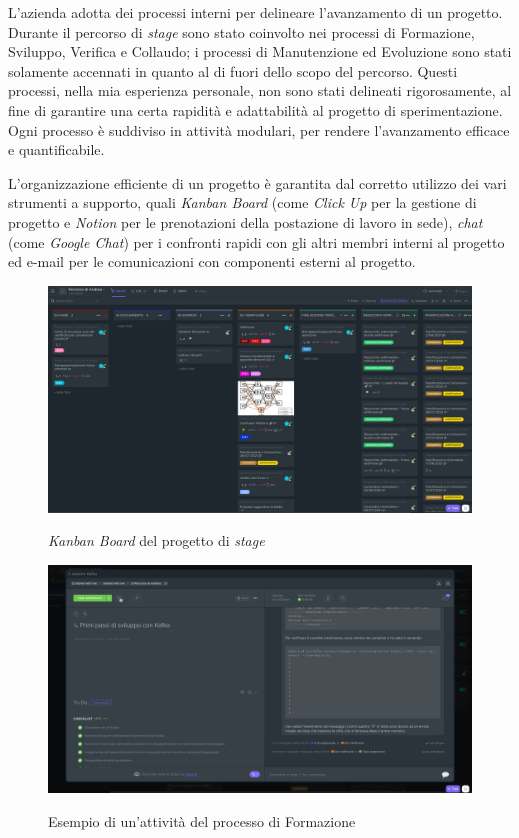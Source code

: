 
L'azienda adotta dei processi interni per delineare l'avanzamento di un progetto.
Durante il percorso di \textit{stage} sono stato coinvolto nei processi di Formazione, Sviluppo, Verifica e Collaudo; i processi di Manutenzione ed Evoluzione sono stati solamente accennati in quanto al di fuori dello scopo del percorso.
Questi processi, nella mia esperienza personale, non sono stati delineati rigorosamente, al fine di garantire una certa rapidità e adattabilità al progetto di sperimentazione.
Ogni processo è suddiviso in attività modulari, per rendere l'avanzamento efficace e quantificabile.

L'organizzazione efficiente di un progetto è garantita dal corretto utilizzo dei vari strumenti a supporto, quali \textit{Kanban Board} (come \textit{Click Up} per la gestione di progetto e \textit{Notion} per le prenotazioni della postazione di lavoro in sede), \textit{chat} (come \textit{Google Chat}) per i confronti rapidi con gli altri membri interni al progetto ed e-mail per le comunicazioni con componenti esterni al progetto.

\bigskip
\begin{figure}[h]
  \includegraphics[width=\textwidth]{images/clickup_board.png}\\
  \caption{\textit{Kanban Board} del progetto di \textit{stage}}
\end{figure}
\begin{figure}[h!]
  \includegraphics[width=\textwidth]{images/clickup_task.png}\\
  \caption{Esempio di un'attività del processo di Formazione}
\end{figure}

